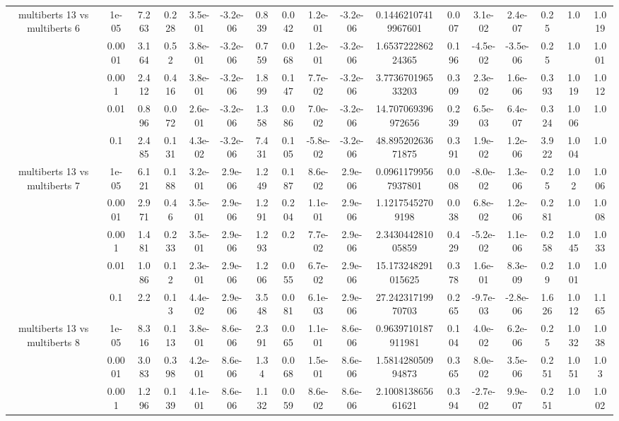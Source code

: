 \begin{tabular}{|c|c|c|c|c|c|c|c|c|c|c|c|c|c|c|c|c|}
\hline
\multirow{5}{*}{multiberts 13 vs multiberts 6} & 1e-05 & 7.263 & 0.228 & 3.5e-01 & -3.2e-06 & 0.839 & 0.042 & 1.2e-01 & -3.2e-06 & 0.14462107419967601 & 0.007 & 3.1e-02 & 2.4e-07 & 0.25 & 1.0 & 1.019 \\
 & 0.0001 & 3.164 & 0.52 & 3.8e-01 & -3.2e-06 & 0.759 & 0.068 & 1.2e-01 & -3.2e-06 & 1.653722286224365 & 0.196 & -4.5e-02 & -3.5e-06 & 0.25 & 1.0 & 1.001 \\
 & 0.001 & 2.412 & 0.416 & 3.8e-01 & -3.2e-06 & 1.899 & 0.147 & 7.7e-02 & -3.2e-06 & 3.773670196533203 & 0.309 & 2.3e-02 & 1.6e-06 & 0.393 & 1.019 & 1.012 \\
 & 0.01 & 0.896 & 0.072 & 2.6e-01 & -3.2e-06 & 1.358 & 0.086 & 7.0e-02 & -3.2e-06 & 14.707069396972656 & 0.239 & 6.5e-03 & 6.4e-07 & 0.324 & 1.006 & 1.0 \\
 & 0.1 & 2.485 & 0.131 & 4.3e-02 & -3.2e-06 & 7.431 & 0.105 & -5.8e-02 & -3.2e-06 & 48.89520263671875 & 0.391 & 1.9e-02 & 1.2e-06 & 3.922 & 1.004 & 1.0 \\
\hline
\multirow{5}{*}{multiberts 13 vs multiberts 7} & 1e-05 & 6.121 & 0.188 & 3.2e-01 & 2.9e-06 & 1.249 & 0.187 & 8.6e-02 & 2.9e-06 & 0.09611799567937801 & 0.008 & -8.0e-02 & 1.3e-06 & 0.25 & 1.02 & 1.006 \\
 & 0.0001 & 2.971 & 0.46 & 3.5e-01 & 2.9e-06 & 1.291 & 0.204 & 1.1e-01 & 2.9e-06 & 1.12175452709198 & 0.038 & 6.8e-02 & 1.2e-06 & 0.281 & 1.0 & 1.008 \\
 & 0.001 & 1.481 & 0.233 & 3.5e-01 & 2.9e-06 & 1.293 & 0.2 & 7.7e-02 & 2.9e-06 & 2.343044281005859 & 0.429 & -5.2e-02 & 1.1e-06 & 0.258 & 1.045 & 1.033 \\
 & 0.01 & 1.086 & 0.12 & 2.3e-01 & 2.9e-06 & 1.206 & 0.055 & 6.7e-02 & 2.9e-06 & 15.173248291015625 & 0.378 & 1.6e-01 & 8.3e-09 & 0.29 & 1.001 & 1.0 \\
 & 0.1 & 2.2 & 0.13 & 4.4e-02 & 2.9e-06 & 3.548 & 0.081 & 6.1e-03 & 2.9e-06 & 27.24231719970703 & 0.265 & -9.7e-03 & -2.8e-06 & 1.626 & 1.012 & 1.165 \\
\hline
\multirow{5}{*}{multiberts 13 vs multiberts 8} & 1e-05 & 8.316 & 0.113 & 3.8e-01 & 8.6e-06 & 2.391 & 0.065 & 1.1e-01 & 8.6e-06 & 0.9639710187911981 & 0.104 & 4.0e-02 & 6.2e-06 & 0.25 & 1.032 & 1.038 \\
 & 0.0001 & 3.083 & 0.398 & 4.2e-01 & 8.6e-06 & 1.34 & 0.068 & 1.5e-01 & 8.6e-06 & 1.581428050994873 & 0.365 & 8.0e-02 & 3.5e-06 & 0.251 & 1.051 & 1.03 \\
 & 0.001 & 1.296 & 0.139 & 4.1e-01 & 8.6e-06 & 1.132 & 0.059 & 8.6e-02 & 8.6e-06 & 2.100813865661621 & 0.394 & -2.7e-02 & 9.9e-07 & 0.251 & 1.0 & 1.002 \\

\end{tabular}

